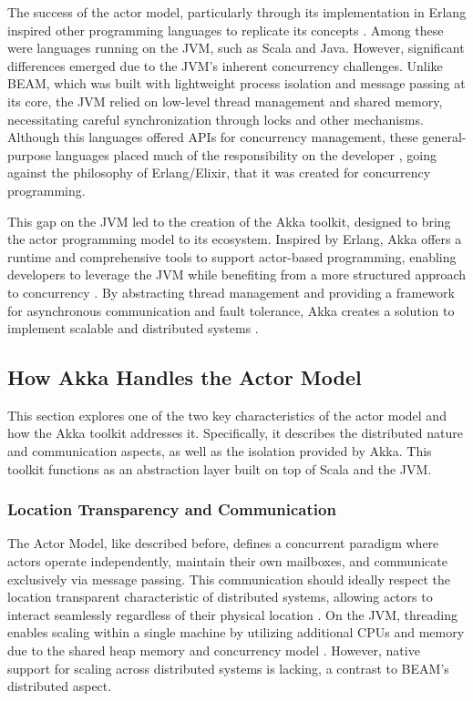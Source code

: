 The success of the actor model, particularly through its implementation in Erlang inspired other programming languages to replicate its concepts \cite{Juric2024,Abraham2023}. Among these were languages running on the \gls{JVM}, such as Scala and Java. However, significant differences emerged due to the JVM’s inherent concurrency challenges. Unlike \gls{BEAM}, which was built with lightweight process isolation and message passing at its core, the \gls{JVM} relied on low-level thread management and shared memory, necessitating careful synchronization through locks and other mechanisms. Although this languages offered \gls{API}s for concurrency management, these general-purpose languages placed much of the responsibility on the developer \cite{Abraham2023,akka-docs}, going against the philosophy of Erlang/Elixir, that it was created for concurrency programming.

This gap on the \gls{JVM} led to the creation of the Akka toolkit, designed to bring the actor programming model to its ecosystem. Inspired by Erlang, Akka offers a runtime and comprehensive tools to support actor-based programming, enabling developers to leverage the \gls{JVM} while benefiting from a more structured approach to concurrency \cite{akka-docs}. By abstracting thread management and providing a framework for asynchronous communication and fault tolerance, Akka creates a solution to implement scalable and distributed systems \cite{Abraham2023}.

\subsection{How Akka Handles the Actor Model}

This section explores one of the two key characteristics of the actor model and how the Akka toolkit addresses it. Specifically, it describes the distributed nature and communication aspects, as well as the isolation provided by Akka. This toolkit functions as an abstraction layer built on top of Scala and the \gls{JVM}.

\subsubsection{Location Transparency and Communication}

The Actor Model, like described before, defines a concurrent paradigm where actors operate independently, maintain their own mailboxes, and communicate exclusively via message passing. This communication should ideally respect the location transparent characteristic of distributed systems, allowing actors to interact seamlessly regardless of their physical location \cite{Armstrong2013}. On the JVM, threading enables scaling within a single machine by utilizing additional CPUs and memory due to the shared heap memory and concurrency model \cite{Abraham2023}. However, native support for scaling across distributed systems is lacking, a contrast to BEAM’s distributed aspect.

